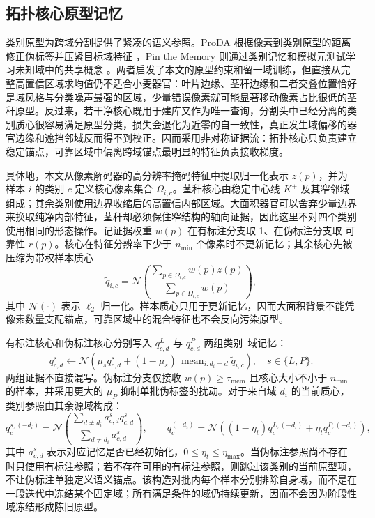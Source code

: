\subsection{拓扑核心原型记忆}
\label{sec:tcpm}

类别原型为跨域分割提供了紧凑的语义参照。ProDA 根据像素到类别原型的距离修正伪标签并压紧目标域特征 \citep{zhang2021proda}，Pin the Memory 则通过类别记忆和模拟元测试学习未知域中的共享概念 \citep{kim2022pinmemory}。两者启发了本文的原型约束和留一域训练，但直接从完整高置信区域求均值仍不适合小麦器官：叶片边缘、茎秆边缘和二者交叠位置恰好是域风格与分类噪声最强的区域，少量错误像素就可能显著移动像素占比很低的茎秆原型。反过来，若干净核心既用于建库又作为唯一查询，分割头中已经分离的类别质心很容易满足原型分类，损失会退化为近零的自一致性，真正发生域偏移的器官边缘和遮挡邻域反而得不到校正。\TCPM 因而采用非对称证据流：拓扑核心只负责建立稳定锚点，可靠区域中偏离跨域锚点最明显的特征负责接收梯度。

具体地，本文从像素解码器的高分辨率掩码特征中提取归一化表示 $z(p)$，并为样本 $i$ 的类别 $c$ 定义核心像素集合 $\Omega_{i,c}$。茎秆核心由稳定中心线 $K^+$ 及其窄邻域组成；其余类别使用边界收缩后的高置信内部区域。大面积器官可以舍弃少量边界来换取纯净内部特征，茎秆却必须保住窄结构的轴向证据，因此这里不对四个类别使用相同的形态操作。记证据权重 $w(p)$ 在有标注分支取 1、在伪标注分支取 \TRPL 可靠性 $r(p)$。核心在特征分辨率下少于 $n_{\min}$ 个像素时不更新记忆；其余核心先被压缩为带权样本质心
\begin{equation}
\widetilde q_{i,c}=\mathcal N\!\left(
\frac{\sum_{p\in\Omega_{i,c}}w(p)z(p)}
{\sum_{p\in\Omega_{i,c}}w(p)}\right),
\label{eq:corecentroid}
\end{equation}
其中 $\mathcal N(\cdot)$ 表示 $\ell_2$ 归一化。样本质心只用于更新记忆，因而大面积背景不能凭像素数量支配锚点，可靠区域中的混合特征也不会反向污染原型。

有标注核心和伪标注核心分别写入 $q^L_{c,d}$ 与 $q^P_{c,d}$ 两组类别--域记忆：
\begin{equation}
q^s_{c,d}\leftarrow\mathcal N\!\left(
\mu_s q^s_{c,d}+(1-\mu_s)\,
\operatorname{mean}_{i:d_i=d}\widetilde q_{i,c}\right),
\quad s\in\{L,P\}.
\label{eq:domainprototype}
\end{equation}
两组证据不直接混写。伪标注分支仅接收 $w(p)\geq\tau_{\mathrm{mem}}$ 且核心大小不小于 $n_{\min}$ 的样本，并采用更大的 $\mu_P$ 抑制单批伪标签的扰动。对于来自域 $d_i$ 的当前质心，类别参照由其余源域构成：
\begin{equation}
q_c^{s,(-d_i)}=\mathcal N\!\left(
\frac{\sum_{d\neq d_i}a^s_{c,d}q^s_{c,d}}
{\sum_{d\neq d_i}a^s_{c,d}}\right),\qquad
\bar q_c^{(-d_i)}=\mathcal N\!\left(
(1-\eta_t)q_c^{L,(-d_i)}+\eta_t q_c^{P,(-d_i)}\right),
\label{eq:lodoanchor}
\end{equation}
其中 $a^s_{c,d}$ 表示对应记忆是否已经初始化，$0\leq\eta_t\leq\eta_{\max}$。当伪标注参照尚不存在时只使用有标注参照；若不存在可用的有标注参照，则跳过该类别的当前原型项，不让伪标注单独定义语义锚点。该构造对批内每个样本分别排除自身域，而不是在一段迭代中冻结某个固定域；所有满足条件的域仍持续更新，因而不会因为阶段性域冻结形成陈旧原型。

